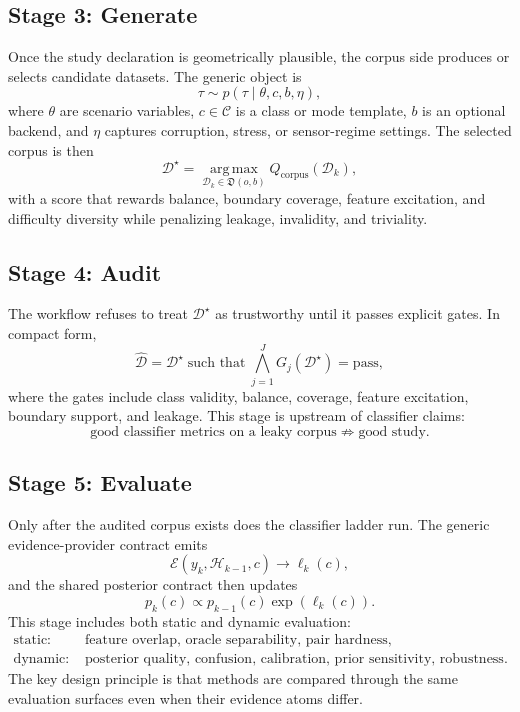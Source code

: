 \documentclass[11pt]{article}
\begin{document}
\subsection{Stage 3: Generate}
Once the study declaration is geometrically plausible, the corpus side produces
or selects candidate datasets. The generic object is
\begin{equation}
\tau \sim p(\tau \mid \theta, c, b, \eta),
\end{equation}
where \(\theta\) are scenario variables, \(c \in \mathcal{C}\) is a class or
mode template, \(b\) is an optional backend, and \(\eta\) captures corruption,
stress, or sensor-regime settings. The selected corpus is then
\begin{equation}
\mathcal{D}^{\star}
=
\operatorname*{arg\,max}_{\mathcal{D}_k \in \mathfrak{D}(o,b)}
Q_{\mathrm{corpus}}(\mathcal{D}_k),
\end{equation}
with a score that rewards balance, boundary coverage, feature excitation, and
difficulty diversity while penalizing leakage, invalidity, and triviality.

\subsection{Stage 4: Audit}
The workflow refuses to treat \(\mathcal{D}^{\star}\) as trustworthy until it
passes explicit gates. In compact form,
\begin{equation}
\widehat{\mathcal{D}}
=
\mathcal{D}^{\star}
\;\text{such that}\;
\bigwedge_{j=1}^{J} G_j(\mathcal{D}^{\star}) = \mathrm{pass},
\end{equation}
where the gates include class validity, balance, coverage, feature excitation,
boundary support, and leakage. This stage is upstream of classifier claims:
\begin{equation}
\text{good classifier metrics on a leaky corpus}
\not\Rightarrow
\text{good study}.
\end{equation}

\subsection{Stage 5: Evaluate}
Only after the audited corpus exists does the classifier ladder run. The
generic evidence-provider contract emits
\begin{equation}
\mathcal{E}(y_k, \mathcal{H}_{k-1}, c) \rightarrow \ell_k(c),
\end{equation}
and the shared posterior contract then updates
\begin{equation}
p_k(c) \propto p_{k-1}(c)\exp(\ell_k(c)).
\end{equation}
This stage includes both static and dynamic evaluation:
\begin{align}
\text{static: }&
\text{feature overlap, oracle separability, pair hardness}, \\
\text{dynamic: }&
\text{posterior quality, confusion, calibration, prior sensitivity, robustness}.
\end{align}
The key design principle is that methods are compared through the same
evaluation surfaces even when their evidence atoms differ.
\end{document}
